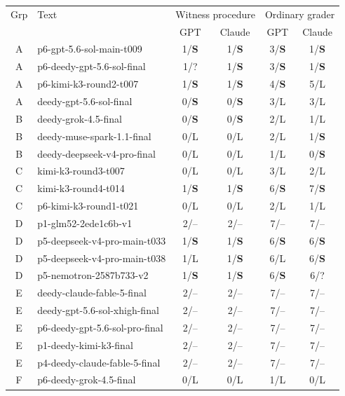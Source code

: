 \begin{tabular}{@{}clcccc@{}}
\toprule
Grp & Text & \multicolumn{2}{c}{Witness procedure} & \multicolumn{2}{c}{Ordinary grader} \\
 & & GPT & Claude & GPT & Claude \\
\midrule
A & p6-gpt-5.6-sol-main-t009 & 1/\textbf{S} & 1/\textbf{S} & 3/\textbf{S} & 1/\textbf{S} \\
A & p6-deedy-gpt-5.6-sol-final & 1/? & 1/\textbf{S} & 3/\textbf{S} & 1/\textbf{S} \\
A & p6-kimi-k3-round2-t007 & 1/\textbf{S} & 1/\textbf{S} & 4/\textbf{S} & 5/L \\
A & deedy-gpt-5.6-sol-final & 0/\textbf{S} & 0/\textbf{S} & 3/L & 3/L \\
\addlinespace[1pt]
B & deedy-grok-4.5-final & 0/\textbf{S} & 0/\textbf{S} & 2/L & 1/L \\
B & deedy-muse-spark-1.1-final & 0/L & 0/L & 2/L & 1/\textbf{S} \\
B & deedy-deepseek-v4-pro-final & 0/L & 0/L & 1/L & 0/\textbf{S} \\
\addlinespace[1pt]
C & kimi-k3-round3-t007 & 0/L & 0/L & 3/L & 2/L \\
C & kimi-k3-round4-t014 & 1/\textbf{S} & 1/\textbf{S} & 6/\textbf{S} & 7/\textbf{S} \\
C & p6-kimi-k3-round1-t021 & 0/L & 0/L & 2/L & 1/L \\
\addlinespace[1pt]
D & p1-glm52-2ede1c6b-v1 & 2/-- & 2/-- & 7/-- & 7/-- \\
D & p5-deepseek-v4-pro-main-t033 & 1/\textbf{S} & 1/\textbf{S} & 6/\textbf{S} & 6/\textbf{S} \\
D & p5-deepseek-v4-pro-main-t038 & 1/L & 1/\textbf{S} & 6/L & 6/\textbf{S} \\
D & p5-nemotron-2587b733-v2 & 1/\textbf{S} & 1/\textbf{S} & 6/\textbf{S} & 6/? \\
\addlinespace[1pt]
E & deedy-claude-fable-5-final & 2/-- & 2/-- & 7/-- & 7/-- \\
E & deedy-gpt-5.6-sol-xhigh-final & 2/-- & 2/-- & 7/-- & 7/-- \\
E & p6-deedy-gpt-5.6-sol-pro-final & 2/-- & 2/-- & 7/-- & 7/-- \\
E & p1-deedy-kimi-k3-final & 2/-- & 2/-- & 7/-- & 7/-- \\
E & p4-deedy-claude-fable-5-final & 2/-- & 2/-- & 7/-- & 7/-- \\
\addlinespace[1pt]
F & p6-deedy-grok-4.5-final & 0/L & 0/L & 1/L & 0/L \\
\bottomrule
\end{tabular}
